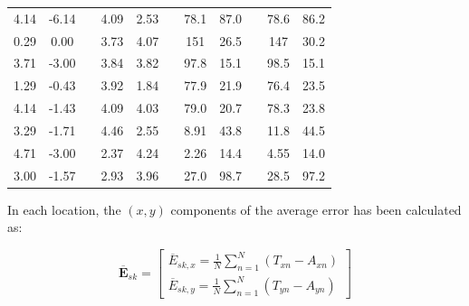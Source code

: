 \documentclass[a4paper, 10 pt, conference]{ieeeconf}      %
\begin{document}
\begin{table}[h!]
\begin{adjustbox}{max width=\textwidth}
\begin{tabular}{@{}ccccclccccc@{}}
			4.14                    & -6.14                  &  & 4.09                  & 2.53                  &  & 78.1                   & 87.0                  &  & 78.6                   & 86.2                  \\
			0.29                    & 0.00                   &  & 3.73                  & 4.07                  &  & 151                    & 26.5                  &  & 147                    & 30.2                  \\
			3.71                    & -3.00                  &  & 3.84                  & 3.82                  &  & 97.8                   & 15.1                  &  & 98.5                   & 15.1                  \\
			1.29                    & -0.43                  &  & 3.92                  & 1.84                  &  & 77.9                   & 21.9                  &  & 76.4                   & 23.5                  \\
			4.14                    & -1.43                  &  & 4.09                  & 4.03                  &  & 79.0                   & 20.7                  &  & 78.3                   & 23.8                  \\
			3.29                    & -1.71                  &  & 4.46                  & 2.55                  &  & 8.91                   & 43.8                  &  & 11.8                   & 44.5                  \\
			4.71                    & -3.00                  &  & 2.37                  & 4.24                  &  & 2.26                   & 14.4                  &  & 4.55                   & 14.0                  \\
			3.00                    & -1.57                  &  & 2.93                  & 3.96                  &  & 27.0                   & 98.7                  &  & 28.5                   & 97.2                  \\ \bottomrule
		\end{tabular}%
	\end{adjustbox}
\end{table}

In each location, the $(x,y)$ components of the average error has been calculated as:

\begin{equation}
\overline{\mathbf{E}}_{sk} = \begin{bmatrix}
\overline{E}_{sk,x}  = \frac{1}{N}\sum_{n=1}^{N} (T_{xn} - A_{xn}) \\
\overline{E}_{sk,y} = \frac{1}{N}\sum_{n=1}^{N} (T_{yn} - A_{yn})
\end{bmatrix}
\end{equation}
\end{document}
